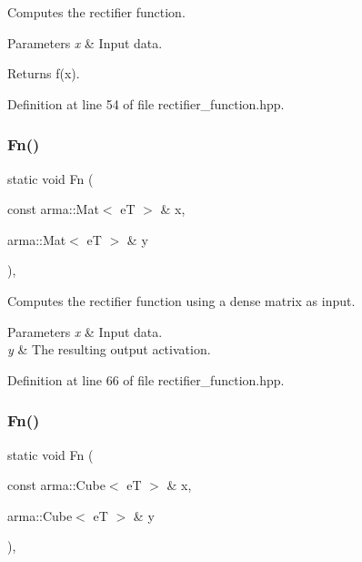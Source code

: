 Computes the rectifier function. 


\begin{DoxyParams}{Parameters}
{\em x} & Input data. \\
\hline
\end{DoxyParams}
\begin{DoxyReturn}{Returns}
f(x). 
\end{DoxyReturn}


Definition at line 54 of file rectifier\+\_\+function.\+hpp.

\mbox{\label{classmlpack_1_1ann_1_1RectifierFunction_ab98eb0966f8d770ad8ce5eb422cc41c0}} 
\subsubsection{Fn()\hspace{0.1cm}{\footnotesize\ttfamily [2/3]}}
{\footnotesize\ttfamily static void Fn (\begin{DoxyParamCaption}\item[{const arma\+::\+Mat$<$ eT $>$ \&}]{x,  }\item[{arma\+::\+Mat$<$ eT $>$ \&}]{y }\end{DoxyParamCaption})\hspace{0.3cm}{\ttfamily [inline]}, {\ttfamily [static]}}



Computes the rectifier function using a dense matrix as input. 


\begin{DoxyParams}{Parameters}
{\em x} & Input data. \\
\hline
{\em y} & The resulting output activation. \\
\hline
\end{DoxyParams}


Definition at line 66 of file rectifier\+\_\+function.\+hpp.

\mbox{\label{classmlpack_1_1ann_1_1RectifierFunction_a6e5b128d616e05849ca1fc1833f7d569}} 
\subsubsection{Fn()\hspace{0.1cm}{\footnotesize\ttfamily [3/3]}}
{\footnotesize\ttfamily static void Fn (\begin{DoxyParamCaption}\item[{const arma\+::\+Cube$<$ eT $>$ \&}]{x,  }\item[{arma\+::\+Cube$<$ eT $>$ \&}]{y }\end{DoxyParamCaption})\hspace{0.3cm}{\ttfamily [inline]}, {\ttfamily [static]}}



